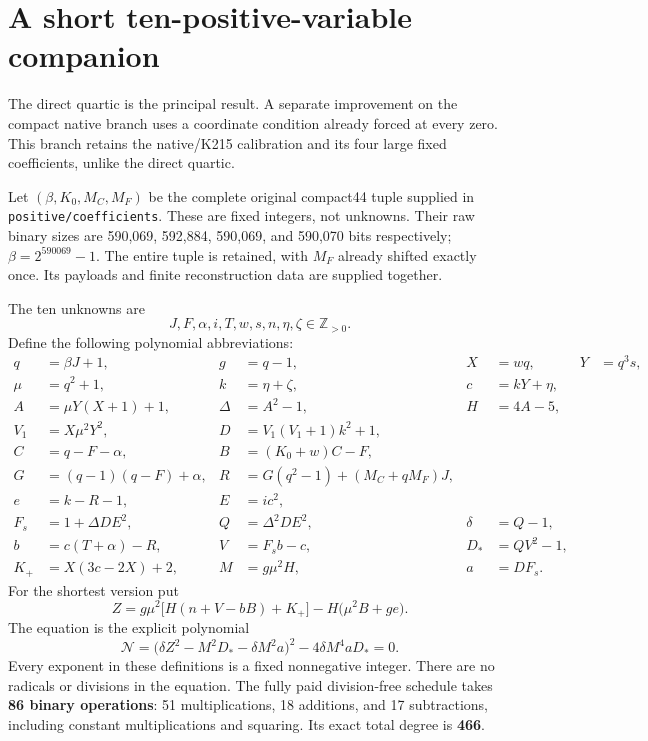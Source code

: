 \documentclass[11pt,letterpaper]{article}
\newcommand{\Pos}{\mathbb Z_{>0}}
\newcommand{\pathfile}[1]{\nolinkurl{#1}}
\theoremstyle{remark}\newtheorem{remark}[theorem]{Remark}
\begin{document}
\section{A short ten-positive-variable companion}\label{sec:positive}

The direct quartic is the principal result.  A separate improvement on the
compact native branch uses a coordinate condition already forced at every
zero.  This branch retains the native/K215 calibration and its four large
fixed coefficients, unlike the direct quartic.

Let $(\beta,K_0,M_C,M_F)$ be the complete original compact44 tuple supplied
in \pathfile{positive/coefficients}.  These are fixed integers, not
unknowns.  Their raw binary sizes are 590,069, 592,884, 590,069, and 590,070
bits respectively; $\beta=2^{590069}-1$.  The entire tuple is retained,
with $M_F$ already shifted exactly once.  Its payloads and finite
reconstruction data are supplied together.

The ten unknowns are
\[
 J,F,\alpha,i,T,w,s,n,\eta,\zeta\in\Pos.
\]
Define the following polynomial abbreviations:
\begin{align*}
 q&=\beta J+1,&g&=q-1,&X&=wq,&Y&=q^3s,\\
 \mu&=q^2+1,&k&=\eta+\zeta,&c&=kY+\eta,\\
 A&=\mu Y(X+1)+1,&\Delta&=A^2-1,&H&=4A-5,\\
 V_1&=X\mu^2Y^2,&D&=V_1(V_1+1)k^2+1,\\
 C&=q-F-\alpha,&B&=(K_0+w)C-F,\\
 G&=(q-1)(q-F)+\alpha,&
 R&=G(q^2-1)+(M_C+qM_F)J,\\
 e&=k-R-1,&E&=ic^2,\\
 F_s&=1+\Delta DE^2,&Q&=\Delta^2DE^2,&\delta&=Q-1,\\
 b&=c(T+\alpha)-R,&V&=F_sb-c,&D_*&=QV^2-1,\\
 K_+&=X(3c-2X)+2,&M&=g\mu^2H,&a&=DF_s.
\end{align*}
For the shortest version put
\begin{equation}\label{eq:positive-Z}
 Z=g\mu^2\bigl[H(n+V-bB)+K_+\bigr]
       -H\bigl(\mu^2B+ge\bigr).
\end{equation}
The equation is the explicit polynomial
\begin{equation}\label{eq:positive-N}
 \boxed{\mathcal N=
 \bigl(\delta Z^2-M^2D_*-\delta M^2a\bigr)^2
       -4\delta M^4aD_*=0.}
\end{equation}
Every exponent in these definitions is a fixed nonnegative integer.
There are no radicals or divisions in the equation.  The fully paid
division-free schedule takes \textbf{86 binary operations}: 51
multiplications, 18 additions, and 17 subtractions, including constant
multiplications and squaring.  Its exact total degree is \textbf{466}.
\end{document}
